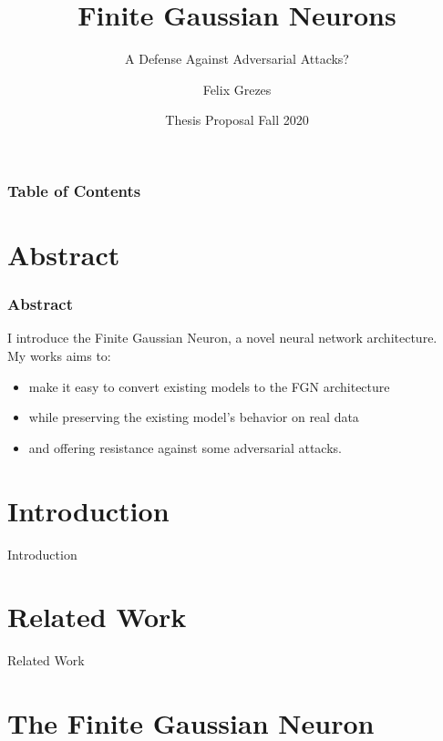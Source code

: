 \documentclass{beamer}
\title[FGNs vs Adversarial Attacks] %
{Finite Gaussian Neurons}
\subtitle{A Defense Against Adversarial Attacks?}
\author[Felix Grezes] %
{Felix Grezes}
\institute[CUNY GC] %
{
  \inst{}%
  Graduate Center\\
  City University of New York
}
\date[Thesis Proposal - Fall 2020] %
{Thesis Proposal Fall 2020}
\begin{document}
\frame{\titlepage}

\begin{frame}
\frametitle{Table of Contents}
\tableofcontents
\end{frame}


\section{Abstract}

\begin{frame}
\frametitle{Abstract}
I introduce the Finite Gaussian Neuron, a novel neural network architecture.\\

My works aims to:
\begin{itemize}
    \item make it easy to convert existing models to the FGN architecture
    \item while preserving the existing model's behavior on real data
    \item and offering resistance against some adversarial attacks.
\end{itemize}

\end{frame}


\section{Introduction}

\begin{frame}{Introduction}
    
\end{frame}


\section{Related Work}

\begin{frame}{Related Work}
    
\end{frame}

\section{The Finite Gaussian Neuron}
\end{document}
